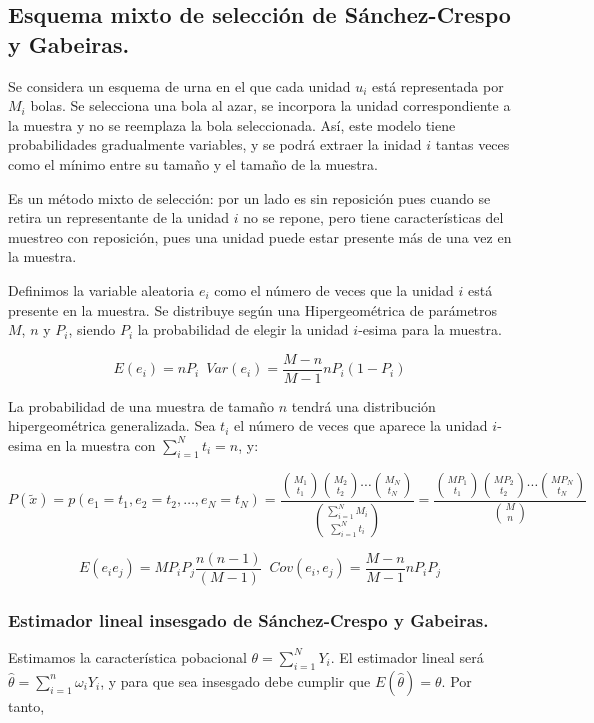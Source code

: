 \subsection{Esquema mixto de selecci\'on de S\'anchez-Crespo y Gabeiras.}

Se considera un esquema de urna en el que cada unidad $u_{i}$ est\'a
representada por $M_{i}$ bolas. Se selecciona una bola al azar, se
incorpora la unidad correspondiente a la muestra y no se reemplaza
la bola seleccionada. As\'i, este modelo tiene probabilidades gradualmente
variables, y se podr\'a extraer la inidad $i$ tantas veces como el
m\'inimo entre su tama\~no y el tama\~no de la muestra.

Es un m\'etodo mixto de selecci\'on: por un lado es sin reposici\'on pues
cuando se retira un representante de la unidad $i$ no se repone,
pero tiene caracter\'isticas del muestreo con reposici\'on, pues una unidad
puede estar presente m\'as de una vez en la muestra.

Definimos la variable aleatoria $e_{i}$ como el n\'umero de veces que
la unidad $i$ est\'a presente en la muestra. Se distribuye seg\'un una
Hipergeom\'etrica de par\'ametros $M$, $n$ y $P_{i}$, siendo $P_{i}$
la probabilidad de elegir la unidad $i$-esima para la muestra.

\[
E\left(e_{i}\right)=nP_{i}\,\,\,Var\left(e_{i}\right)=\dfrac{M-n}{M-1}nP_{i}\left(1-P_{i}\right)
\]


La probabilidad de una muestra de tama\~no $n$ tendr\'a una distribuci\'on
hipergeom\'etrica generalizada. Sea $t_{i}$ el n\'umero de veces que
aparece la unidad $i$-esima en la muestra con $\sum_{i=1}^{N}t_{i}=n$,
y:

\[
P\left(\tilde{x}\right)=p\left(e_{1}=t_{1},e_{2}=t_{2},\ldots,e_{N}=t_{N}\right)=\dfrac{\binom{M_{1}}{t_{1}}\binom{M_{2}}{t_{2}}\cdots\binom{M_{N}}{t_{N}}}{\binom{\sum_{i=1}^{N}M_{i}}{\sum_{i=1}^{N}t_{i}}}=\dfrac{\binom{MP_{1}}{t_{1}}\binom{MP_{2}}{t_{2}}\cdots\binom{MP_{N}}{t_{N}}}{\binom{M}{n}}
\]


\[
E\left(e_{i}e_{j}\right)=MP_{i}P_{j}\dfrac{n\left(n-1\right)}{\left(M-1\right)}\,\,\,Cov\left(e_{i},e_{j}\right)=\dfrac{M-n}{M-1}nP_{i}P_{j}
\]



\subsubsection{Estimador lineal insesgado de S\'anchez-Crespo y Gabeiras.}

Estimamos la caracter\'istica pobacional $\theta=\sum_{i=1}^{N}Y_{i}$.
El estimador lineal ser\'a $\hat{\theta}=\sum_{i=1}^{n}\omega_{i}Y_{i}$,
y para que sea insesgado debe cumplir que $E\left(\hat{\theta}\right)=\theta$.
Por tanto,

